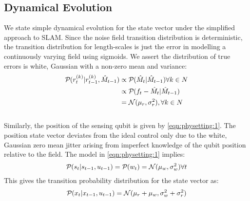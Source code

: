  \subsection{Dynamical Evolution}
 We state simple dynamical evolution for the state vector under the simplified approach to SLAM. Since the noise field transition distribution is deterministic, the transition distribution for length-scales is just the error in modelling a continuously varying field using sigmoids. We assert the distribution of true errors is white, Gaussian with a non-zero mean and variance:
 \begin{align}
 \mathcal{P}_{} (  r_t^{(k)} |  r_{t-1}^{(k)} , \hat{M}_{t-1} )  & \propto    \mathcal{P}_{} (  \hat{M}_{t} |  \hat{M}_{t-1} )  \forall k \in N \label{eqn:slam:dynamics:r:1} \\
 & \propto \mathcal{P}_{} (  f_t - \hat{M}_{t} |  \hat{M}_{t-1} ) \label{eqn:slam:dynamics:r:2}\\
 & = \mathcal{N}(\mu_r, \sigma^2_r),\forall k \in N \label{eqn:slam:dynamics:r:3}
 \end{align}\\
 Similarly, the position of the sensing qubit is given by \cref{eqn:physetting:1}. The position state vector deviates from the ideal control only due to the white, Gaussian zero mean jitter arising from imperfect knowledge of the qubit position relative to the field. The model in \cref{eqn:physetting:1}  implies:
 \begin{align}
 \mathcal{P}_{} (  s_{ t}| s_{ t-1}, u_{t-1} ) = \mathcal{P}_{} (  w_t ) = \mathcal{N}(\mu_w, \sigma^2_w) \forall t \label{eqn:slam:dynamics:process}
 \end{align} 
 This gives the transition probability distribution for the state vector as:
 \begin{align}
 \mathcal{P}_{} ( x_{t}| x_{t-1}, u_{t-1} ) = \mathcal{N}(\mu_r + \mu_w, \sigma^2_w + \sigma^2_r) \label{eqn:slam:dynamics:full}
 \end{align}
 
